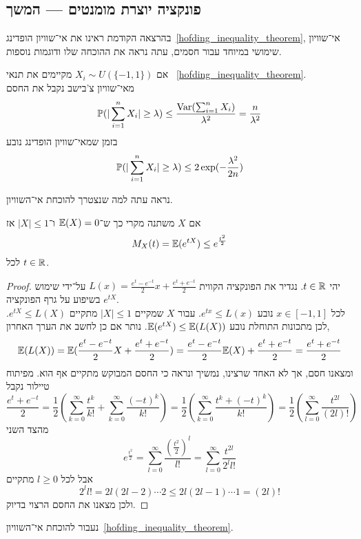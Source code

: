 \subsection{פונקציה יוצרת מומנטים --- המשך}
בהרצאה הקודמת ראינו את אי־שוויון הופדינג\ \ref{hofding_inequality_theorem}, אי־שוויון שימושי במיוחד עבור חסמים, עתה נראה את ההוכחה שלו ודוגמות נוספות.
\begin{example}
	אם $X_i \sim U(\{-1, 1\})$ מקיימים את תנאי \ \ref{hofding_inequality_theorem}. \\
	מאי־שוויון צ'בישב נקבל את החסם
	\[
		\mathbb{P}(| \sum_{i = 1}^{n} X_i | \ge \lambda)
		\le \frac{\operatorname{Var}(\sum_{i = 1}^{n} X_i)}{\lambda^2}
		= \frac{n}{\lambda^2}
	\]
	בזמן שמאי־שוויון הופדינג נובע
	\[
		\mathbb{P}(| \sum_{i = 1}^{n} X_i | \ge \lambda)
		\le 2 \exp(- \frac{\lambda^2}{2n})
	\]
\end{example}
נראה עתה למה שנצטרך להוכחת אי־השוויון.
\begin{lemma}
	אם $X$ משתנה מקרי כך ש־$\mathbb{E}(X) = 0$ ו־$|X| \le 1$ אז
	\[
		M_X(t)
		= \mathbb{E}(e^{tX})
		\le e^{\frac{t^2}{2}}
	\]
	לכל $t \in \mathbb{R}$.
\end{lemma}
\begin{proof}
	יהי $t \in \mathbb{R}$.
	נגדיר את הפונקציה הקווית $L(x) = \frac{e^t - e^{-t}}{2} x + \frac{e^t + e^{-t}}{2}$ על־ידי שימוש בשיפוע על גרף הפונקציה $e^{tX}$. \\
	לכל $x \in [-1, 1]$ נובע $e^{tx} \le L(x)$.
	עבור $X$ שמקיים $|X| \le 1$ מתקיים $e^{tX} \le L(X)$.
	לכן מתכונות התוחלת נובע $\mathbb{E}(e^{tX}) \le \mathbb{E}(L(X))$.
	נותר אם כן לחשב את הערך האחרון,
	\[
		\mathbb{E}(L(X))
		= \mathbb{E}(\frac{e^t - e^{-t}}{2} X + \frac{e^t + e^{-t}}{2})
		= \frac{e^t - e^{-t}}{2} \mathbb{E}(X) + \frac{e^t + e^{-t}}{2}
		= \frac{e^t + e^{-t}}{2}
	\]
	ומצאנו חסם, אך לא האחד שרצינו, נמשיך ונראה כי החסם המבוקש מתקיים אף הוא.
	מפיתוח טיילור נקבל
	\[
		\frac{e^t + e^{-t}}{2}
		= \frac{1}{2} \left(\sum_{k = 0}^{\infty} \frac{t^k}{k!} + \sum_{k = 0}^{\infty} \frac{{(-t)}^k}{k!} \right)
		= \frac{1}{2} \left(\sum_{k = 0}^{\infty} \frac{t^k + {(-t)}^k}{k!}\right)
		= \frac{1}{2} \left(\sum_{l = 0}^{\infty} \frac{t^{2l}}{(2l)!}\right)
	\]
	מהצד השני
	\[
		e^{\frac{t^2}{2}}
		= \sum_{l = 0}^{\infty} \frac{{\left(\frac{t^2}{2}\right)}^l}{l!}
		= \sum_{l = 0}^{\infty} \frac{t^{2l}}{2^l l!}
	\]
	אבל לכל $l \ge 0$ מתקיים
	\[
		2^l l! = 2l (2l - 2) \cdots 2 \le 2 l (2l - 1) \cdots 1 = (2l)!
	\]
	ולכן מצאנו את החסם הרצוי בדיוק.
\end{proof}
נעבור להוכחת אי־השוויון\ \ref{hofding_inequality_theorem}.
